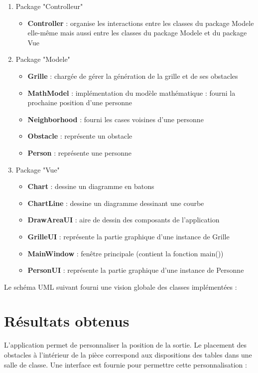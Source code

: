 \documentclass[twoside,UTF8]{EPURapport}
\begin{document}
	\begin{enumerate}
		\item Package "Controlleur"
		\begin{itemize}
			\item \textbf{Controller} : organise les interactions entre les classes du package Modele elle-même mais aussi entre les classes du package Modele et du package Vue
		\end{itemize}
		
		\item Package "Modele"
		\begin{itemize}
			\item \textbf{Grille} : chargée de gérer la génération de la grille et de ses obstacles
			\item \textbf{MathModel} : implémentation du modèle mathématique : fourni la prochaine position d'une personne
			\item \textbf{Neighborhood} : fourni les cases voisines d'une personne
			\item \textbf{Obstacle} : représente un obstacle
			\item \textbf{Person} : représente une personne
		\end{itemize}
		
		\item Package "Vue"
		\begin{itemize}
			\item \textbf{Chart} : dessine un diagramme en batons
			\item \textbf{ChartLine} : dessine un diagramme dessinant une courbe
			\item \textbf{DrawAreaUI} : aire de dessin des composants de l'application
			\item \textbf{GrilleUI} : représente la partie graphique d'une instance de Grille 
			\item \textbf{MainWindow} : fenêtre principale (contient la fonction main())
			\item \textbf{PersonUI} : représente la partie graphique d'une instance de Personne
		\end{itemize}
	\end{enumerate}	
	
	Le schéma UML suivant fourni une vision globale des classes implémentées : \\
	
	
	
	\section{Résultats obtenus}
		L'application permet de personnaliser la position de la sortie. Le placement des obstacles à l'intérieur de la pièce correspond aux dispositions des tables dans une salle de classe. Une interface est fournie pour permettre cette personnalisation :
		
\end{document}
